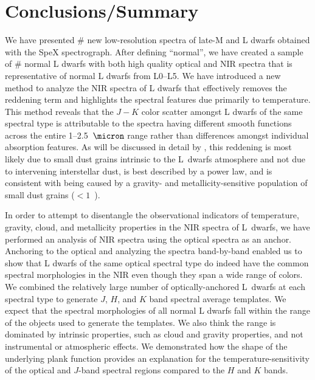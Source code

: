 \documentclass[12pt,preprint]{aastex}
\begin{document}
								   
								    
\clearpage 
\section{Conclusions/Summary}
\label{sec:summary}

We have presented \# new low-resolution spectra of late-M and L dwarfs obtained with the SpeX spectrograph.
After defining ``normal'', we have created a sample of \# normal L dwarfs with both high quality optical and NIR spectra that is representative of normal L dwarfs from L0--L5.
We have introduced a new method to analyze the NIR spectra of L dwarfs that effectively removes the reddening term and highlights the spectral features due primarily to temperature. 
This method reveals that the $J-K$ color scatter amongst L dwarfs of the same spectral type is attributable to the spectra having different smooth functions across the entire 1--2.5~$\micron$ range rather than differences amongst individual absorption features.
As will be discussed in detail by \citet[in prep.]{Hiranaka13}, this reddening is most likely due to small dust grains intrinsic to the L~dwarfs atmosphere and not due to intervening interstellar dust, is best described by a power law, and is consistent with being caused by a gravity- and metallicity-sensitive population of small dust grains ($<1$~\micron).

In order to attempt to disentangle the observational indicators of temperature, gravity, cloud, and metallicity properties in the NIR spectra of L~dwarfs, we have performed an analysis of NIR spectra using the optical spectra as an anchor.
Anchoring to the optical and analyzing the spectra band-by-band enabled us to show that L dwarfs of the same optical spectral type do indeed have the common spectral morphologies in the NIR even though they span a wide range of colors.
We combined the relatively large number of optically-anchored L~dwarfs at each spectral type to generate $J$, $H$, and $K$ band spectral average templates. We expect that the spectral morphologies of all normal L dwarfs fall within the range of the objects used to generate the templates. We also think the range is dominated by intrinsic properties, such as cloud and gravity properties, and not instrumental or atmospheric effects.
We demonstrated how the shape of the underlying plank function provides an explanation for the temperature-sensitivity of the optical and $J$-band spectral regions compared to the $H$ and $K$ bands.
\end{document}
